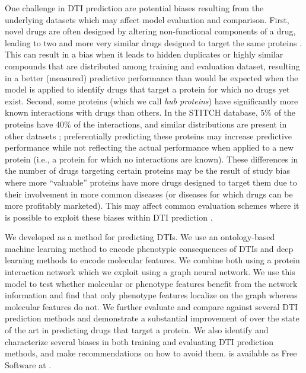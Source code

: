 \documentclass{bioinfo}
\renewcommand{\cite}{\citep}
\begin{document}
One challenge in DTI prediction are potential biases resulting from
the underlying datasets \citep{Pahikkala2014} which may affect model
evaluation and comparison. First, novel drugs are often designed by
altering non-functional components of a drug, leading to two and more
very similar drugs designed to target the same proteins
\cite{Overington2006}. This can result in a bias when it leads to
hidden duplicates or highly similar compounds that are distributed
among training and evaluation dataset, resulting in a better
(measured) predictive performance than would be expected when the
model is applied to identify drugs that target a protein for which no
drugs yet exist. Second, some proteins (which we call \textit{hub
  proteins}) have significantly more known interactions with drugs
than others. In the STITCH database, $5\%$ of the proteins have $40\%$
of the interactions, and similar distributions are present in other
datasets \cite{Drugbank2007, Drugbank2017}; preferentially predicting
these proteins may increase predictive performance while not
reflecting the actual performance when applied to a new protein (i.e.,
a protein for which no interactions are known). These differences in
the number of drugs targeting certain proteins may be the result of
study bias where more ``valuable'' proteins have more drugs designed
to target them due to their involvement in more common diseases (or
diseases for which drugs can be more profitably marketed). This may
affect common evaluation schemes where it is possible
to exploit these biases within DTI prediction \cite{Survey2018}.

We developed \name{} as a method for predicting DTIs. We use an
ontology-based machine learning method \cite{} to encode phenotypic
consequences of DTIs and deep learning methods to encode molecular
features. We combine both using a protein interaction network which we
exploit using a graph neural network. We use this model to test
whether molecular or phenotype features benefit from the network
information and find that only phenotype features localize on the
graph whereas molecular features do not. We further evaluate and
compare \name{} against several DTI prediction methods and
demonstrate a substantial improvement of \name{} over the state of the
art in predicting drugs that target a protein. We also identify and
characterize several biases in both training and evaluating DTI
prediction methods, and make recommendations on how to avoid
them. \name is available as Free Software at \url{}.

\end{document}
